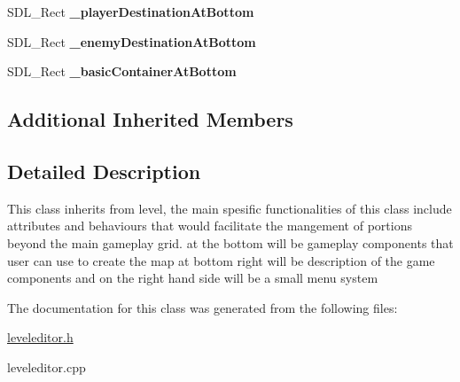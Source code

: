 \begin{DoxyCompactItemize}
\item 
\hypertarget{class_level_editor_a96b67be32e0a946ebca8e97ab508048c}{}\label{class_level_editor_a96b67be32e0a946ebca8e97ab508048c} 
S\+D\+L\+\_\+\+Rect {\bfseries \+\_\+player\+Destination\+At\+Bottom}
\item 
\hypertarget{class_level_editor_ae91bdd589e1538b7fc29c3d3392d7630}{}\label{class_level_editor_ae91bdd589e1538b7fc29c3d3392d7630} 
S\+D\+L\+\_\+\+Rect {\bfseries \+\_\+enemy\+Destination\+At\+Bottom}
\item 
\hypertarget{class_level_editor_a32538e3d011bb4c9e214113023594b99}{}\label{class_level_editor_a32538e3d011bb4c9e214113023594b99} 
S\+D\+L\+\_\+\+Rect {\bfseries \+\_\+basic\+Container\+At\+Bottom}
\end{DoxyCompactItemize}
\subsection*{Additional Inherited Members}


\subsection{Detailed Description}
This class inherits from level, the main spesific functionalities of this class include attributes and behaviours that would facilitate the mangement of portions beyond the main gameplay grid. at the bottom will be gameplay components that user can use to create the map at bottom right will be description of the game components and on the right hand side will be a small menu system 

The documentation for this class was generated from the following files\+:\begin{DoxyCompactItemize}
\item 
\hyperlink{leveleditor_8h}{leveleditor.\+h}\item 
leveleditor.\+cpp\end{DoxyCompactItemize}
